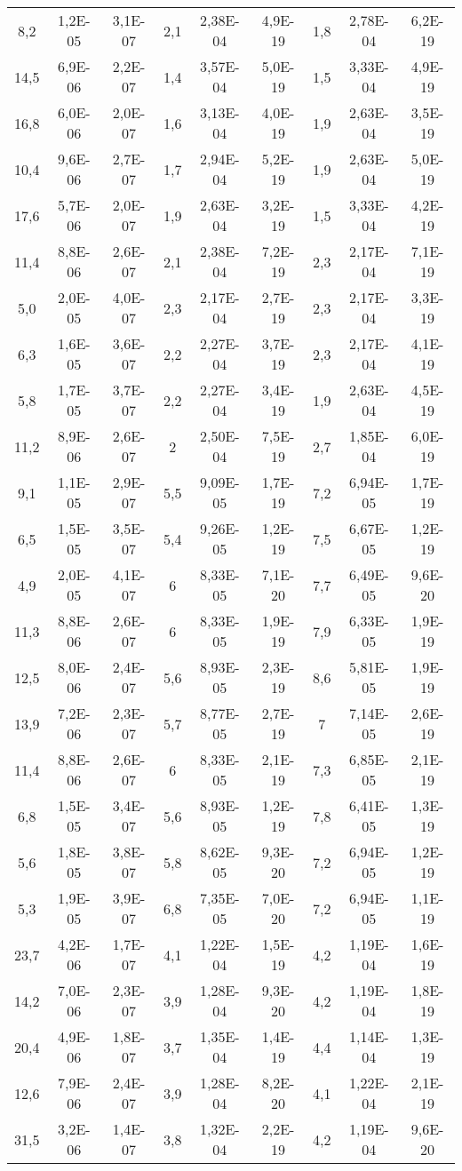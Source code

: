 \begin{longtable}{c c c c c c c c c}
8,2 & 1,2E-05 & 3,1E-07 & 2,1 & 2,38E-04 & 4,9E-19 & 1,8 & 2,78E-04 & 6,2E-19 \\ 
14,5 & 6,9E-06 & 2,2E-07 & 1,4 & 3,57E-04 & 5,0E-19 & 1,5 & 3,33E-04 & 4,9E-19 \\ 
16,8 & 6,0E-06 & 2,0E-07 & 1,6 & 3,13E-04 & 4,0E-19 & 1,9 & 2,63E-04 & 3,5E-19 \\ 
10,4 & 9,6E-06 & 2,7E-07 & 1,7 & 2,94E-04 & 5,2E-19 & 1,9 & 2,63E-04 & 5,0E-19 \\ 
17,6 & 5,7E-06 & 2,0E-07 & 1,9 & 2,63E-04 & 3,2E-19 & 1,5 & 3,33E-04 & 4,2E-19 \\ \bottomrule
11,4 & 8,8E-06 & 2,6E-07 & 2,1 & 2,38E-04 & 7,2E-19 & 2,3 & 2,17E-04 & 7,1E-19 \\ 
5,0 & 2,0E-05 & 4,0E-07 & 2,3 & 2,17E-04 & 2,7E-19 & 2,3 & 2,17E-04 & 3,3E-19 \\ 
6,3 & 1,6E-05 & 3,6E-07 & 2,2 & 2,27E-04 & 3,7E-19 & 2,3 & 2,17E-04 & 4,1E-19 \\ 
5,8 & 1,7E-05 & 3,7E-07 & 2,2 & 2,27E-04 & 3,4E-19 & 1,9 & 2,63E-04 & 4,5E-19 \\ 
11,2 & 8,9E-06 & 2,6E-07 & 2 & 2,50E-04 & 7,5E-19 & 2,7 & 1,85E-04 & 6,0E-19 \\ 
\bottomrule
9,1 & 1,1E-05 & 2,9E-07 & 5,5 & 9,09E-05 & 1,7E-19 & 7,2 & 6,94E-05 & 1,7E-19 \\ 
6,5 & 1,5E-05 & 3,5E-07 & 5,4 & 9,26E-05 & 1,2E-19 & 7,5 & 6,67E-05 & 1,2E-19 \\ 
4,9 & 2,0E-05 & 4,1E-07 & 6 & 8,33E-05 & 7,1E-20 & 7,7 & 6,49E-05 & 9,6E-20 \\ 
11,3 & 8,8E-06 & 2,6E-07 & 6 & 8,33E-05 & 1,9E-19 & 7,9 & 6,33E-05 & 1,9E-19 \\ 
12,5 & 8,0E-06 & 2,4E-07 & 5,6 & 8,93E-05 & 2,3E-19 & 8,6 & 5,81E-05 & 1,9E-19 \\ \bottomrule
13,9 & 7,2E-06 & 2,3E-07 & 5,7 & 8,77E-05 & 2,7E-19 & 7 & 7,14E-05 & 2,6E-19 \\ 
11,4 & 8,8E-06 & 2,6E-07 & 6 & 8,33E-05 & 2,1E-19 & 7,3 & 6,85E-05 & 2,1E-19 \\ 
6,8 & 1,5E-05 & 3,4E-07 & 5,6 & 8,93E-05 & 1,2E-19 & 7,8 & 6,41E-05 & 1,3E-19 \\ 
5,6 & 1,8E-05 & 3,8E-07 & 5,8 & 8,62E-05 & 9,3E-20 & 7,2 & 6,94E-05 & 1,2E-19 \\ 
5,3 & 1,9E-05 & 3,9E-07 & 6,8 & 7,35E-05 & 7,0E-20 & 7,2 & 6,94E-05 & 1,1E-19 \\ \bottomrule

23,7 & 4,2E-06 & 1,7E-07 & 4,1 & 1,22E-04 & 1,5E-19 & 4,2 & 1,19E-04 & 1,6E-19 \\ 
14,2 & 7,0E-06 & 2,3E-07 & 3,9 & 1,28E-04 & 9,3E-20 & 4,2 & 1,19E-04 & 1,8E-19 \\ 
20,4 & 4,9E-06 & 1,8E-07 & 3,7 & 1,35E-04 & 1,4E-19 & 4,4 & 1,14E-04 & 1,3E-19 \\ 
12,6 & 7,9E-06 & 2,4E-07 & 3,9 & 1,28E-04 & 8,2E-20 & 4,1 & 1,22E-04 & 2,1E-19 \\ 
31,5 & 3,2E-06 & 1,4E-07 & 3,8 & 1,32E-04 & 2,2E-19 & 4,2 & 1,19E-04 & 9,6E-20 \\ \midrule


\end{longtable}
